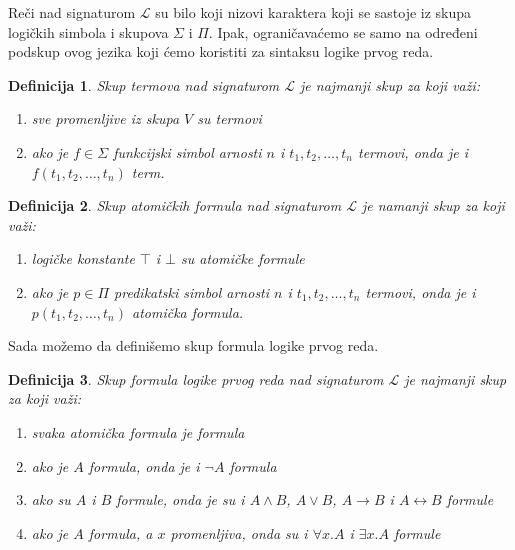 \documentclass[a4paper,10pt]{article}
\newtheorem{definition}{Definicija}[section]
\theoremstyle{remark}
\begin{document}
Reči nad signaturom $\mathcal{L}$ su bilo koji nizovi karaktera koji se sastoje
iz skupa logičkih simbola i skupova $\Sigma$ i $\Pi$.
Ipak, ograničavaćemo se samo na određeni podskup ovog jezika koji ćemo
koristiti za sintaksu logike prvog reda.

\begin{definition}
    Skup termova nad signaturom $\mathcal{L}$ je najmanji skup za koji važi:
    \begin{enumerate}
        \itemsep-0.3em
        \item sve promenljive iz skupa $V$ su termovi
        \item ako je $f \in \Sigma$ funkcijski simbol arnosti $n$ i
        $t_1, t_2, \ldots, t_n$ termovi, onda je i $f(t_1, t_2, \ldots, t_n)$
        term.
    \end{enumerate}
\end{definition}

\begin{definition}
    Skup atomičkih formula nad signaturom $\mathcal{L}$ je namanji skup za koji
    važi:
    \begin{enumerate}
        \itemsep-0.3em
        \item logičke konstante $\top$ i $\bot$ su atomičke formule
        \item ako je $p \in \Pi$ predikatski simbol arnosti $n$ i
        $t_1, t_2, \ldots, t_n$ termovi, onda je i $p(t_1, t_2, \ldots, t_n)$
        atomička formula.
    \end{enumerate}
\end{definition}

Sada možemo da definišemo skup formula logike prvog reda.

\begin{definition}
    Skup formula logike prvog reda nad signaturom $\mathcal{L}$ je najmanji
    skup za koji važi:
    \begin{enumerate}
        \itemsep-0.3em
        \item svaka atomička formula je formula
        \item ako je $A$ formula, onda je i $\neg A$ formula
        \item ako su $A$ i $B$ formule, onda je su i $A \land B$, $A \lor B$,
        $A \rightarrow B$ i $A \leftrightarrow B$ formule
        \item ako je $A$ formula, a $x$ promenljiva, onda su i $\forall x. A$ i
        $\exists x. A$ formule
    \end{enumerate}
\end{definition}
\end{document}

